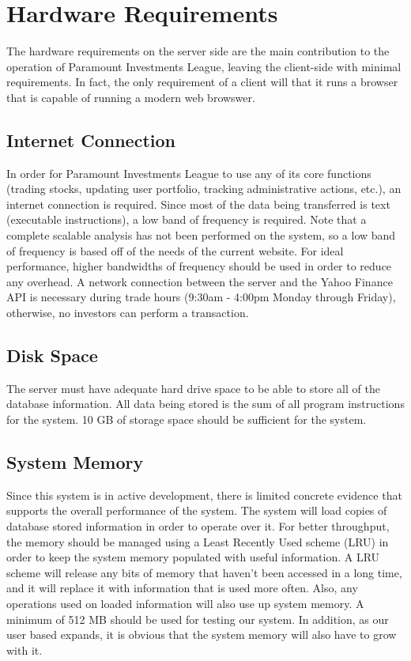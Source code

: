\section{Hardware Requirements}

The hardware requirements on the server side are the main
contribution to the operation of Paramount Investments League,
leaving the client-side with minimal requirements. In fact,
the only requirement of a client will that it runs a browser
that is capable of running a modern web browswer.

\subsection{Internet Connection}

In order for Paramount Investments League to use any of its core
functions (trading stocks, updating user portfolio, tracking
administrative actions, etc.), an internet connection is required.
Since most of the data being transferred is text (executable
instructions), a low band of frequency is required. Note that a
complete scalable analysis has not been performed on the system,
so a low band of frequency is based off of the needs of the current
website. For ideal performance, higher bandwidths of frequency
should be used in order to reduce any overhead. A network
connection between the server and the Yahoo Finance API is necessary
during trade hours (9:30am - 4:00pm Monday through Friday), otherwise,
no investors can perform a transaction.

\subsection{Disk Space}

The server must have adequate hard drive space to be able to
store all of the database information. All data being stored
is the sum of all program instructions for the system. 10 GB
of storage space should be sufficient for the system.

\subsection{System Memory}

Since this system is in active development, there is limited
concrete evidence that supports the overall performance of the
system. The system will load copies of database stored information
in order to operate over it. For better throughput, the memory
should be managed using a Least Recently Used scheme (LRU) in
order to keep the system memory populated with useful information.
A LRU scheme will release any bits of memory that haven’t been
accessed in a long time, and it will replace it with information
that is used more often. Also, any operations used on loaded
information will also use up system memory. A minimum of 512 MB
should be used for testing our system. In addition, as our user
based expands, it is obvious that the system memory will also
have to grow with it.

